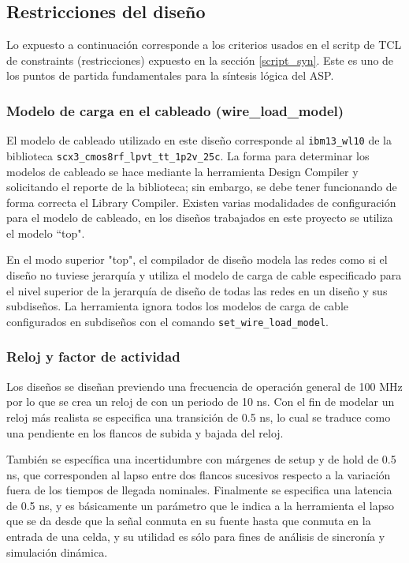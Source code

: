 \subsection{Restricciones del diseño}
\label{s_sec:const}

Lo expuesto a continuación corresponde a los criterios usados en el scritp de TCL de constraints (restricciones) expuesto en la sección \ref{script_syn}. Este es uno de los puntos de partida fundamentales para la síntesis lógica del ASP.

\subsubsection{Modelo de carga en el cableado (wire\_load\_model)}

El modelo de cableado utilizado en este diseño corresponde al \texttt{ibm13\_wl10} de la biblioteca \texttt{scx3\_cmos8rf\_lpvt\_tt\_1p2v\_25c}. La forma para determinar los modelos de cableado se hace mediante la herramienta Design Compiler y solicitando el reporte de la biblioteca; sin embargo, se debe tener funcionando de forma correcta el Library Compiler. Existen varias modalidades de configuración para el modelo de cableado, en los diseños trabajados en este proyecto se utiliza el modelo ``top".

En el modo superior "top", el compilador de diseño modela las redes como si el diseño no tuviese jerarquía y utiliza el modelo de carga de cable especificado para el nivel superior de la jerarquía de diseño de todas las redes en un diseño y sus subdiseños. La herramienta ignora todos los modelos de carga de cable configurados en subdiseños con el comando \texttt{set\_wire\_load\_model}.

\subsubsection{Reloj y factor de actividad}
\label{subsub:alfa}
Los diseños se diseñan previendo una frecuencia de operación general de 100 MHz por lo que se crea un reloj de con un periodo de 10 ns. Con el fin de modelar un reloj más realista se especifica una transición de 0.5 ns, lo cual se traduce como una pendiente en los flancos de subida y bajada del reloj.

También se específica una incertidumbre con márgenes de setup y de hold de 0.5 ns, que corresponden al lapso entre dos flancos sucesivos respecto a la variación fuera de los tiempos de llegada nominales. Finalmente se especifica una latencia de 0.5 ns, y es básicamente un parámetro que le indica a la herramienta el lapso que se da desde que la señal conmuta en su fuente hasta que conmuta en la entrada de una celda, y su utilidad es sólo para fines de análisis de sincronía y simulación dinámica.

